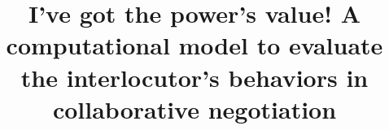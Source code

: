 \documentclass[conference, letterpaper]{IEEEtran}
\begin{document}
	
	\title{I've got the power's value! A computational model to evaluate the interlocutor's behaviors in collaborative negotiation}
	
	
	
	
	
\end{document}
